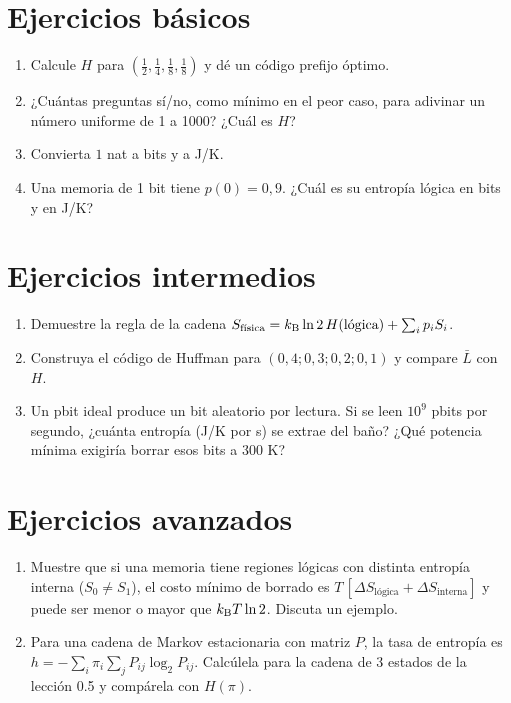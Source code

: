 \documentclass[11pt,a4paper]{article}
\begin{document}

\section{Ejercicios básicos}
\begin{enumerate}[label=\textbf{B\arabic*.}]
\item Calcule $H$ para $(\frac12,\frac14,\frac18,\frac18)$ y dé un código prefijo óptimo.
\item ¿Cuántas preguntas sí/no, como mínimo en el peor caso, para adivinar un número uniforme de 1 a 1000? ¿Cuál es $H$?
\item Convierta $1$ nat a bits y a J/K.
\item Una memoria de 1 bit tiene $p(0)=0{,}9$. ¿Cuál es su entropía lógica en bits y en J/K?
\end{enumerate}

\section{Ejercicios intermedios}
\begin{enumerate}[label=\textbf{I\arabic*.}]
\item Demuestre la regla de la cadena $S_{\text{física}}=k_{\mathrm B}\ln2\,H(\text{lógica})+\sum_ip_iS_i$.
\item Construya el código de Huffman para $(0{,}4;0{,}3;0{,}2;0{,}1)$ y compare $\bar L$ con $H$.
\item Un pbit ideal produce un bit aleatorio por lectura. Si se leen $10^9$ pbits por segundo, ¿cuánta entropía (J/K por s) se extrae del baño? ¿Qué potencia mínima exigiría borrar esos bits a 300 K?
\end{enumerate}

\section{Ejercicios avanzados}
\begin{enumerate}[label=\textbf{A\arabic*.}]
\item Muestre que si una memoria tiene regiones lógicas con distinta entropía interna ($S_0\neq S_1$), el costo mínimo de borrado es $T\,[\Delta S_{\text{lógica}}+\Delta S_{\text{interna}}]$ y puede ser menor o mayor que $k_{\mathrm B} T\ln2$. Discuta un ejemplo.
\item Para una cadena de Markov estacionaria con matriz $P$, la tasa de entropía es $h=-\sum_i\pi_i\sum_jP_{ij}\log_2P_{ij}$. Calcúlela para la cadena de 3 estados de la lección 0.5 y compárela con $H(\pi)$.
\end{enumerate}
\end{document}

